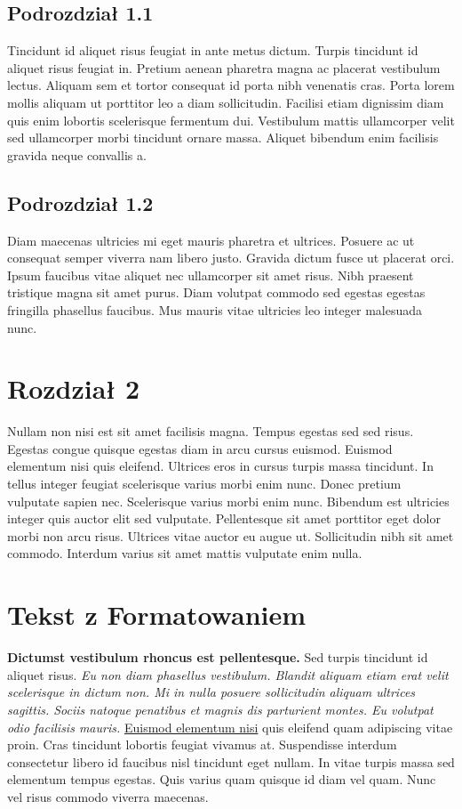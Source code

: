 \documentclass[12pt, a4paper]{article}
\begin{document}
\subsection{Podrozdział 1.1}
Tincidunt id aliquet risus feugiat in ante metus dictum. Turpis tincidunt id aliquet risus feugiat in. Pretium aenean pharetra magna ac placerat vestibulum lectus. Aliquam sem et tortor consequat id porta nibh venenatis cras. Porta lorem mollis aliquam ut porttitor leo a diam sollicitudin. Facilisi etiam dignissim diam quis enim lobortis scelerisque fermentum dui. Vestibulum mattis ullamcorper velit sed ullamcorper morbi tincidunt ornare massa. Aliquet bibendum enim facilisis gravida neque convallis a. 

\subsection{Podrozdział 1.2}
Diam maecenas ultricies mi eget mauris pharetra et ultrices. Posuere ac ut consequat semper viverra nam libero justo. Gravida dictum fusce ut placerat orci. Ipsum faucibus vitae aliquet nec ullamcorper sit amet risus. Nibh praesent tristique magna sit amet purus. Diam volutpat commodo sed egestas egestas fringilla phasellus faucibus. Mus mauris vitae ultricies leo integer malesuada nunc.

\section{Rozdział 2}
Nullam non nisi est sit amet facilisis magna. Tempus egestas sed sed risus. Egestas congue quisque egestas diam in arcu cursus euismod. Euismod elementum nisi quis eleifend. Ultrices eros in cursus turpis massa tincidunt. In tellus integer feugiat scelerisque varius morbi enim nunc. Donec pretium vulputate sapien nec. Scelerisque varius morbi enim nunc. Bibendum est ultricies integer quis auctor elit sed vulputate. Pellentesque sit amet porttitor eget dolor morbi non arcu risus. Ultrices vitae auctor eu augue ut. Sollicitudin nibh sit amet commodo. Interdum varius sit amet mattis vulputate enim nulla.

\section{Tekst z Formatowaniem}
\textbf{Dictumst vestibulum rhoncus est pellentesque.} Sed turpis tincidunt id aliquet risus. 
\textit{Eu non diam phasellus vestibulum. Blandit aliquam etiam erat velit scelerisque in dictum non. Mi in nulla posuere sollicitudin aliquam ultrices sagittis. Sociis natoque penatibus et magnis dis parturient montes. Eu volutpat odio facilisis mauris.}
\underline{Euismod elementum nisi} quis eleifend quam adipiscing vitae proin. Cras tincidunt lobortis feugiat vivamus at. Suspendisse interdum consectetur libero id faucibus nisl tincidunt eget nullam. In vitae turpis massa sed elementum tempus egestas. Quis varius quam quisque id diam vel quam. Nunc vel risus commodo viverra maecenas.
\end{document}
